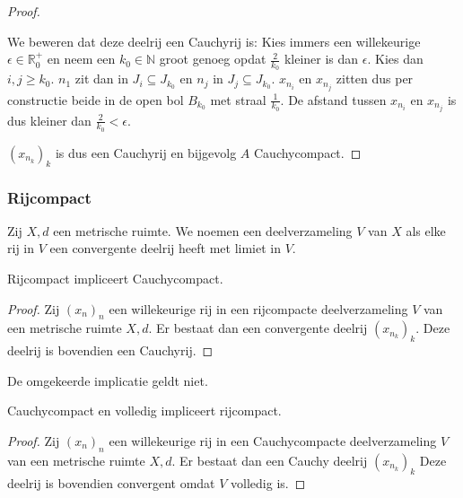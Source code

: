 \documentclass[main.tex]{subfiles}
\begin{document}
\begin{st}
\begin{proof}
\begin{itemize}
        We beweren dat deze deelrij een Cauchyrij is:
        Kies immers een willekeurige $\epsilon \in \mathbb{R}_{0}^{+}$ en neem een $k_{0}\in \mathbb{N}$ groot genoeg opdat $\frac{2}{k_{0}}$ kleiner is dan $\epsilon$.
        Kies dan $i,j \ge k_{0}$. $n_{1}$ zit dan in $J_{i} \subseteq J_{k_{0}}$ en $n_{j}$ in $J_{j} \subseteq J_{k_{0}}$.
        $x_{n_{i}}$ en $x_{n_{j}}$ zitten dus per constructie beide in de open bol $B_{k_{0}}$ met straal $\frac{1}{k_{0}}$.
        De afstand tussen $x_{n_{i}}$ en $x_{n_{j}}$ is dus kleiner dan $\frac{2}{k_{0}} < \epsilon$.
      \end{itemize}
      $(x_{n_{k}})_{k}$ is dus een Cauchyrij en bijgevolg $A$ Cauchycompact.
    \end{proof}
  \end{st}

\subsubsection{Rijcompact}
\label{sec:rijcompact}

\begin{de}
  Zij $X,d$ een metrische ruimte.
  We noemen een deelverzameling $V$ van $X$  als elke rij in $V$ een convergente deelrij heeft met limiet in $V$.
\end{de}

\begin{st}
  \label{st:rijcompact-dan-cauchycompact}
  Rijcompact impliceert Cauchycompact.

  \begin{proof}
    Zij $(x_{n})_{n}$ een willekeurige rij in een rijcompacte deelverzameling $V$ van een metrische ruimte $X,d$.
    Er bestaat dan een convergente deelrij $(x_{n_{k}})_{k}$.
    Deze deelrij is bovendien een Cauchyrij.
  \end{proof}
\end{st}

\begin{tvb}
  De omgekeerde implicatie geldt niet.
\end{tvb}

\begin{st}
  \label{st:cauchycompact-en-volledig-dan-rijcompact}
  Cauchycompact en volledig impliceert rijcompact.

  \begin{proof}
    Zij $(x_{n})_{n}$ een willekeurige rij in een Cauchycompacte deelverzameling $V$ van een metrische ruimte $X,d$.
    Er bestaat dan een Cauchy deelrij $(x_{n_{k}})_{k}$
    Deze deelrij is bovendien convergent omdat $V$ volledig is.
  \end{proof}
\end{st}
\end{document}
